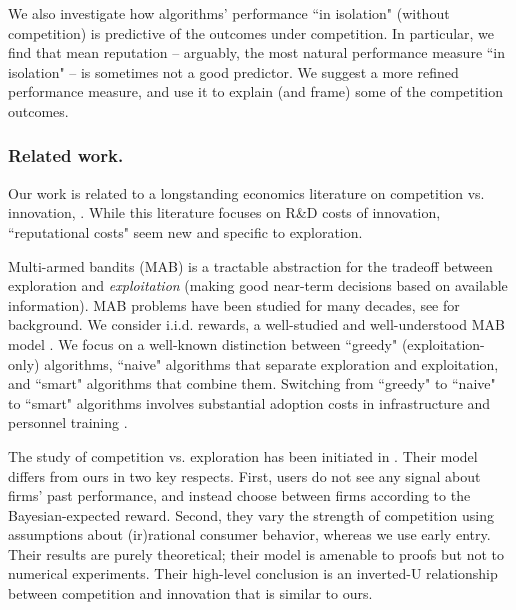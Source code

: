 \documentclass[../competing_bandits_with_appendix.tex]{subfiles}
\begin{document}
We also investigate how algorithms' performance ``in isolation" (without competition) is predictive of the outcomes under competition. In particular, we find that mean reputation -- arguably, the most natural performance measure ``in isolation" -- is sometimes not a good predictor. We suggest a more refined performance measure, and use it to explain (and frame) some of the competition outcomes.


\subsubsection{Related work.}
Our work is related to a longstanding economics literature on competition vs. innovation, \eg \cite{Schumpeter-42,barro2004economic,Aghion-QJE05}. While this literature focuses on R\&D costs of innovation, ``reputational costs" seem new and specific to exploration.

Multi-armed bandits (MAB) is a tractable abstraction for the tradeoff between exploration and \emph{exploitation} (making good near-term decisions based on available information). MAB problems have been studied for many decades, see \cite{Bubeck-survey12} for background. We consider i.i.d. rewards, a well-studied and well-understood MAB model \cite{bandits-ucb1}. We focus on a well-known distinction between ``greedy" (exploitation-only) algorithms, ``naive" algorithms that separate exploration and exploitation, and ``smart" algorithms that combine them. Switching from ``greedy" to ``naive" to ``smart" algorithms involves substantial adoption costs in infrastructure and personnel training \cite{MWT-WhitePaper-2016,DS-arxiv}.

The study of competition vs. exploration has been initiated in \cite{CompetingBandits-itcs16}. Their model differs from ours in two key respects. First, users do not see any signal about firms' past performance, and instead choose between firms according to the Bayesian-expected reward. Second, they vary the strength of competition using assumptions about (ir)rational consumer behavior, whereas we use early entry. Their results are purely theoretical; their model is amenable to proofs but not to numerical experiments. Their high-level conclusion is an inverted-U relationship between competition and innovation that is similar to ours.
\end{document}

